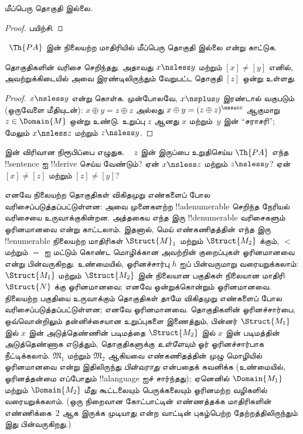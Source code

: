 \documentclass[../../../include/open-logic-section]{subfiles}
\begin{document}
\begin{prop}
மீப்பெரு தொகுதி இல்லை.
\end{prop}

\begin{proof}
பயிற்சி.
\end{proof}

\begin{prob}
~$\Th{PA}$ இன் நிலையற்ற மாதிரியில் மீப்பெரு தொகுதி இல்லை என்று
காட்டுக.
\end{prob}

\begin{prop}
தொகுதிகளின் வரிசை செறிந்தது. அதாவது $x \nsless y$ மற்றும்
$[x] \neq [y]$ எனில், அவற்றுக்கிடையில் அவை இரண்டிலிருந்தும் வேறுபட்ட
தொகுதி $[z]$ ஒன்று உள்ளது.
\end{prop}

\begin{proof}
$x \nsless y$ என்று கொள்க. முன்போலவே, $x \nsplus y$ இரண்டால்
வகுபடும் (ஒருவேளை மீதியுடன்): $x \oplus y = z \oplus z$ அல்லது
$x \oplus y = (z \oplus
z)^\nssucc$ ஆகுமாறு $z \in \Domain{M}$ ஒன்று உண்டு. உறுப்பு $z$
ஆனது $x$ மற்றும்~$y$ இன் ``சராசரி''; மேலும் $x
\nsless z$ மற்றும் $z \nsless y$.
\end{proof}

\begin{prob}
 இன் விரிவான நிரூபிப்பை
எழுதுக. ~ $z$ இன் இருப்பை உறுதிசெய்ய $\Th{PA}$ எந்த !!{sentence}
ஐ !!{derive} செய்ய வேண்டும்? ஏன் $x \nsless z$ மற்றும்
$z \nsless y$? ஏன் $[x] \neq [z]$ மற்றும் $[z]
\neq [y]$?
\end{prob}

\begin{explain}
எனவே நிலையற்ற தொகுதிகள் விகிதமுறு எண்களைப் போல வரிசைப்படுத்தப்பட்டுள்ளன:
அவை முனைகளற்ற !!a{denumerable} செறிந்த நேரியல் வரிசையை உருவாக்குகின்றன.
அத்தகைய எந்த இரு !!{denumerable} வரிசைகளும் ஓரினமானவை என்று காட்டலாம்.
இதனால், மெய் எண்கணிதத்தின் எந்த இரு !!{enumerable} நிலையற்ற மாதிரிகள்
$\Struct{M}_1$ மற்றும் $\Struct{M_2}$ க்கும், $<$ மற்றும் $=$ ஐ மட்டும்
கொண்ட மொழிக்கான அவற்றின் குறைப்புகள் ஓரினமானவை என்று பின்வருகிறது.
உண்மையில், ஓரினச்சார்பு $h$ ஐப் பின்வருமாறு வரையறுக்கலாம்:
$\Struct{M_1}$ மற்றும் $\Struct{M_2}$ இன் நிலையான பகுதிகள் நிலையான
மாதிரி $\Struct{N}$ க்கு ஓரினமானவை; எனவே ஒன்றுக்கொன்றும் ஓரினமானவை.
நிலையற்ற பகுதியை உருவாக்கும் தொகுதிகள் தாமே விகிதமுறு எண்களைப் போல
வரிசைப்படுத்தப்பட்டுள்ளன; எனவே ஓரினமானவை. தொகுதிகளின் ஓரினச்சார்பை,
ஒவ்வொன்றிலும் தன்னிச்சையான உறுப்புகளை இணைத்தும், பின்னர்
$\Struct{M_1}$ இல் $x$ இன் அடுத்தெண்ணின் படிமத்தை $\Struct{M_2}$ இல்
$x$ இன் படிமத்தின் அடுத்தெண்ணாக எடுத்தும், தொகுதிகளுக்கு
\emph{உள்ளேயும்} ஓர் ஓரினச்சார்பாக நீட்டிக்கலாம்.
$\mathfrak{M}_1$ மற்றும் $\mathfrak{M}_2$ ஆகியவை எண்கணிதத்தின் முழு
மொழியில் ஓரினமானவை என்று இதிலிருந்து \emph{பின்வராது} என்பதைக்
கவனிக்க (உண்மையில், ஓரினத்தன்மை எப்போதும் !!a{language} ஐச் சார்ந்தது);
ஏனெனில் $\Domain{M_1}$ மற்றும் $\Domain{M_2}$ மீது கூட்டலையும்
பெருக்கலையும் ஓரினமற்ற வழிகளில் வரையறுக்கலாம். (ஒரு நிறைவான
கோட்பாட்டின் எண்ணத்தக்க மாதிரிகளின் எண்ணிக்கை~2 ஆக இருக்க முடியாது
என்ற வாட்டின் புகழ்பெற்ற தேற்றத்திலிருந்தும் இது பின்வருகிறது.)
\end{explain}
\end{document}
